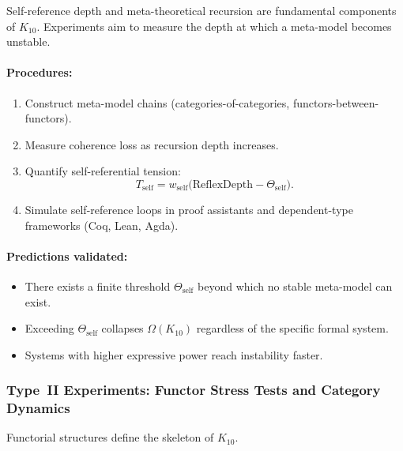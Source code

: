 Self-reference depth and meta-theoretical recursion are fundamental 
components of $K_{10}$.  
Experiments aim to measure the depth at which a meta-model becomes 
unstable.

\paragraph{Procedures:}

\begin{enumerate}
    \item Construct meta-model chains (categories-of-categories, 
          functors-between-functors).
    \item Measure coherence loss as recursion depth increases.
    \item Quantify self-referential tension:
          \[
              T_{\mathrm{self}} = 
              w_{\mathrm{self}}\bigl(
                 \mathrm{ReflexDepth} - \Theta_{\mathrm{self}}
              \bigr).
          \]
    \item Simulate self-reference loops in proof assistants and 
          dependent-type frameworks (Coq, Lean, Agda).
\end{enumerate}

\paragraph{Predictions validated:}

\begin{itemize}
    \item There exists a finite threshold $\Theta_{\mathrm{self}}$ beyond 
          which no stable meta-model can exist.
    \item Exceeding $\Theta_{\mathrm{self}}$ collapses 
          $\Omega(K_{10})$ regardless of the specific formal system.
    \item Systems with higher expressive power reach instability faster.
\end{itemize}



\subsubsection{Type~II Experiments: Functor Stress Tests and Category Dynamics}

Functorial structures define the skeleton of $K_{10}$.

